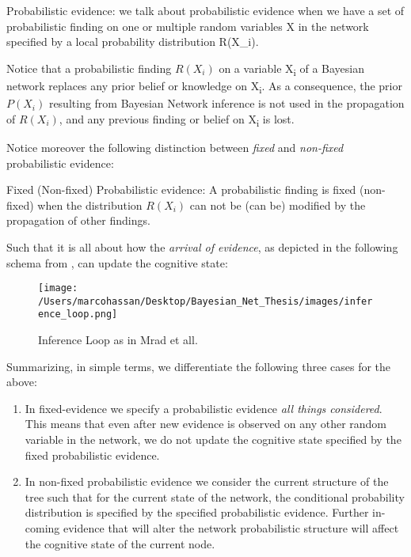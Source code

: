 \documentclass[11pt]{article}
\begin{document}
\begin{article}
\\\\

\begin{definition}
Probabilistic evidence: we talk about probabilistic evidence when we
have a set of probabilistic finding on one or multiple random variables X in the network
specified by a local probability distribution R(X_i).
\end{definition}  

Notice that a probabilistic finding \(R(X_i)\) on a variable X\textsubscript{i} of a
Bayesian network replaces any prior belief or knowledge on X\textsubscript{i}. As
a consequence, the prior \(P (X_i)\) resulting from Bayesian Network
inference is not used in the propagation of \(R(X_i)\), and any
previous finding or belief on X\textsubscript{i} is lost.

Notice moreover the following distinction between \emph{fixed} and
\emph{non-fixed} probabilistic evidence:

\begin{definition}
Fixed (Non-fixed) Probabilistic evidence: A probabilistic finding
is fixed (non-fixed) when the distribution $R(X_i)$ can not be (can
be) modified by the propagation of other findings.
\end{definition}  

Such that it is all about how the \emph{arrival of evidence}, as depicted
in the following schema from \cite{Mrad_2015}, can update the
cognitive state:

\begin{figure}[htbp]
\centering
\texttt{[image: /Users/marcohassan/Desktop/Bayesian\_Net\_Thesis/images/inference\_loop.png]}
\caption{Inference Loop as in Mrad et all.}
\end{figure}


Summarizing, in simple terms, we differentiate the following three
cases for the above:

\begin{enumerate}
\item In fixed-evidence we specify a probabilistic evidence \emph{all things
considered}. This means that even after new evidence is observed
on any other random variable in the network, we do not update the
cognitive state specified by the fixed probabilistic evidence.

\item In non-fixed probabilistic evidence we consider the current
structure of the tree such that for the current state of the
network, the conditional probability distribution is specified by
the specified probabilistic evidence. Further in-coming evidence
that will alter the network probabilistic structure will affect
the cognitive state of the current node.


\end{enumerate}
\end{article}
\end{document}
